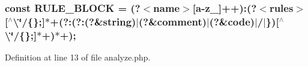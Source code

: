 \subsubsection[{R\+U\+L\+E\+\_\+\+B\+L\+O\+C\+K}]{\setlength{\rightskip}{0pt plus 5cm}const R\+U\+L\+E\+\_\+\+B\+L\+O\+C\+K = \textquotesingle{}(?$<${\bf name}$>$[{\bf a}-\/z\+\_\+]++)\+:(?$<$rules$>$[$^\wedge$\textbackslash{}\textquotesingle{}\char`\"{}/\{\};]$\ast$+(?\+:(?\+:(?\&string)$\vert$(?\&comment)$\vert$(?\&code)$\vert$/$\vert$\})[$^\wedge$\textbackslash{}\textquotesingle{}\char`\"{}/\{\};]$\ast$+)$\ast$+);\textquotesingle{}}\label{analyze_8php_a50e07741d6d63a4616bf249e0de4aece}


Definition at line 13 of file analyze.\+php.

